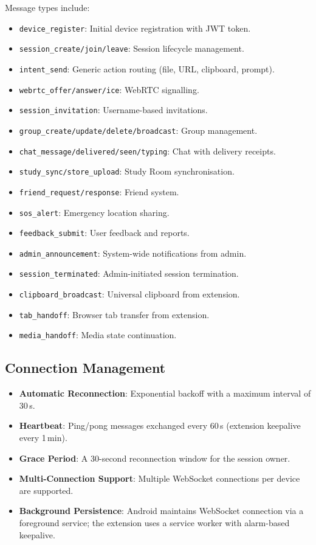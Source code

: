 \documentclass[conference]{IEEEtran}
\begin{document}
Message types include:
\begin{itemize}
    \item \texttt{device\_register}: Initial device registration with JWT token.
    \item \texttt{session\_create/join/leave}: Session lifecycle management.
    \item \texttt{intent\_send}: Generic action routing (file, URL, clipboard, prompt).
    \item \texttt{webrtc\_offer/answer/ice}: WebRTC signalling.
    \item \texttt{session\_invitation}: Username-based invitations.
    \item \texttt{group\_create/update/delete/broadcast}: Group management.
    \item \texttt{chat\_message/delivered/seen/typing}: Chat with delivery receipts.
    \item \texttt{study\_sync/store\_upload}: Study Room synchronisation.
    \item \texttt{friend\_request/response}: Friend system.
    \item \texttt{sos\_alert}: Emergency location sharing.
    \item \texttt{feedback\_submit}: User feedback and reports.
    \item \texttt{admin\_announcement}: System-wide notifications from admin.
    \item \texttt{session\_terminated}: Admin-initiated session termination.
    \item \texttt{clipboard\_broadcast}: Universal clipboard from extension.
    \item \texttt{tab\_handoff}: Browser tab transfer from extension.
    \item \texttt{media\_handoff}: Media state continuation.
\end{itemize}

\subsection{Connection Management}

\begin{itemize}
    \item \textbf{Automatic Reconnection}: Exponential backoff with a maximum interval of 30\,s.
    \item \textbf{Heartbeat}: Ping/pong messages exchanged every 60\,s (extension keepalive every 1\,min).
    \item \textbf{Grace Period}: A 30-second reconnection window for the session owner.
    \item \textbf{Multi-Connection Support}: Multiple WebSocket connections per device are supported.
    \item \textbf{Background Persistence}: Android maintains WebSocket connection via a foreground service; the extension uses a service worker with alarm-based keepalive.
\end{itemize}
\end{document}
